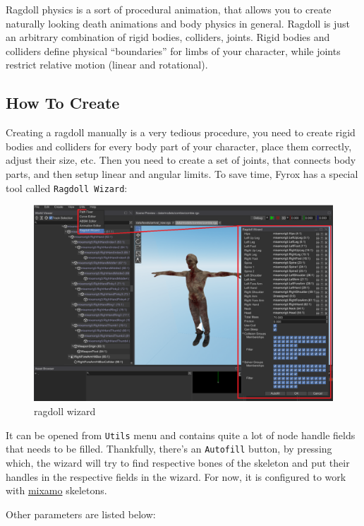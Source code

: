 \documentclass[
]{book}
\theoremstyle{definition}
\theoremstyle{definition}
\theoremstyle{definition}
\theoremstyle{definition}
\theoremstyle{remark}
\begin{document}
Ragdoll physics is a sort of procedural animation, that allows you to create naturally looking death animations and body physics in general. Ragdoll is just an arbitrary combination of rigid bodies, colliders, joints. Rigid bodies and colliders define physical ``boundaries'' for limbs of your character, while joints restrict relative motion (linear and rotational).

\subsection{How To Create}\label{how-to-create-12}

Creating a ragdoll manually is a very tedious procedure, you need to create rigid bodies and colliders for every body part of your character, place them correctly, adjust their size, etc. Then you need to create a set of joints, that connects body parts, and then setup linear and angular limits. To save time, Fyrox has a special tool called \texttt{Ragdoll\ Wizard}:

\begin{figure}
\centering
\includegraphics{images/physics_ragdoll.png}
\caption{ragdoll wizard}
\end{figure}

It can be opened from \texttt{Utils} menu and contains quite a lot of node handle fields that needs to be filled. Thankfully, there's an \texttt{Autofill} button, by pressing which, the wizard will try to find respective bones of the skeleton and put their handles in the respective fields in the wizard. For now, it is configured to work with \href{https://www.mixamo.com}{mixamo} skeletons.

Other parameters are listed below:
\end{document}
